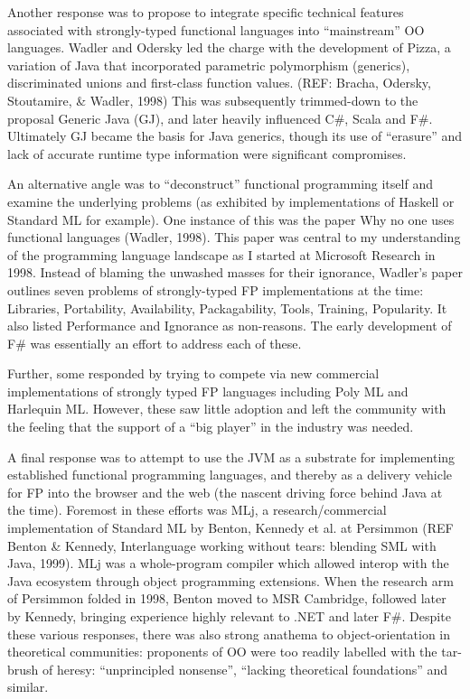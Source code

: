 \documentclass[acmsmall,review]{acmart}\settopmatter{printfolios=true,printccs=false,printacmref=false}
\begin{document}
Another response was to propose to integrate specific technical features associated with strongly-typed functional languages into “mainstream” OO languages.  Wadler and Odersky led the charge with the development of Pizza, a variation of Java that incorporated parametric polymorphism (generics), discriminated unions and first-class function values. (REF: Bracha, Odersky, Stoutamire, \& Wadler, 1998)  This was subsequently trimmed-down to the proposal Generic Java (GJ), and later heavily influenced C\#, Scala and F\#. Ultimately GJ became the basis for Java generics, though its use of “erasure” and lack of accurate runtime type information were significant compromises. 

An alternative angle was to “deconstruct” functional programming itself and examine the underlying problems (as exhibited by implementations of Haskell or Standard ML for example). One instance of this was the paper Why no one uses functional languages (Wadler, 1998). This paper was central to my understanding of the programming language landscape as I started at Microsoft Research in 1998.  Instead of blaming the unwashed masses for their ignorance, Wadler’s paper outlines seven problems of strongly-typed FP implementations at the time: Libraries, Portability, Availability, Packagability, Tools, Training, Popularity.  It also listed Performance and Ignorance as non-reasons. The early development of F\# was essentially an effort to address each of these.

Further, some responded by trying to compete via new commercial implementations of strongly typed FP languages including Poly ML and Harlequin ML. However, these saw little adoption and left the community with the feeling that the support of a “big player” in the industry was needed. 

A final response was to attempt to use the JVM as a substrate for implementing established functional programming languages, and thereby as a delivery vehicle for FP into the browser and the web (the nascent driving force behind Java at the time).  Foremost in these efforts was MLj, a research/commercial implementation of Standard ML by Benton, Kennedy et al. at Persimmon (REF Benton \& Kennedy, Interlanguage working without tears: blending SML with Java, 1999).  MLj was a whole-program compiler which allowed interop with the Java ecosystem through object programming extensions. When the research arm of Persimmon folded in 1998, Benton moved to MSR Cambridge, followed later by Kennedy, bringing experience highly relevant to .NET and later F\#. Despite these various responses, there was also strong anathema to object-orientation in theoretical communities: proponents of OO were too readily labelled with the tar-brush of heresy: “unprincipled nonsense”, “lacking theoretical foundations” and similar.  
\end{document}
